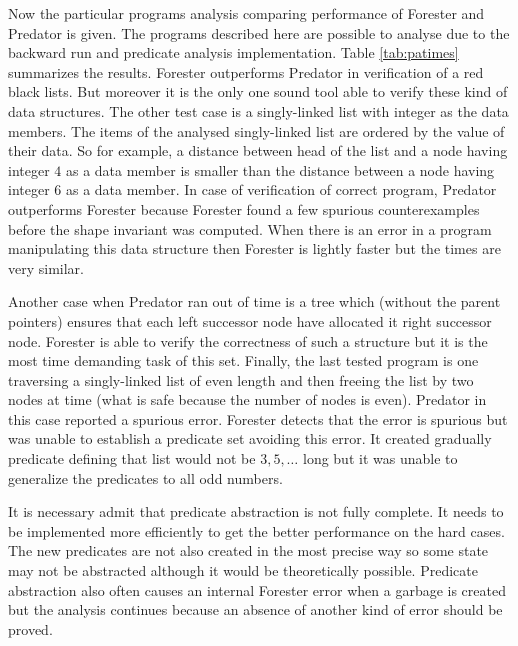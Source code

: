Now the particular programs analysis comparing performance
of Forester and Predator is given.
The programs described here are possible to analyse due to the
backward run and predicate analysis implementation.
Table \ref{tab:patimes} summarizes the results.
Forester outperforms Predator in verification of a red black lists.
But moreover it is the only one sound tool able to verify these
kind of data structures.
The other test case is a singly-linked list with integer
as the data members.
The items of the analysed singly-linked list are ordered
by the value of their data.
So for example, a distance between head of the list and a 
node having integer $4$ as a data member is smaller than
the distance between a node having integer $6$ as a data member.
In case of verification of correct program, Predator outperforms Forester
because Forester found a few spurious counterexamples
before the shape invariant was computed.
When there is an error in a program manipulating this
data structure then Forester is lightly faster
but the times are very similar.

Another case when Predator ran out of time
is a tree which (without the parent pointers) ensures
that each left successor node have allocated it
right successor node.
Forester is able to verify the correctness of such a structure
but it is the most time demanding task of this set.
Finally, the last tested program is one traversing
a singly-linked list of even length and then
freeing the list by two nodes at time (what is safe because
the number of nodes is even).
Predator in this case reported a spurious error.
Forester detects that the error is spurious but was
unable to establish a predicate set avoiding this error.
It created gradually predicate defining that list would not
be $3, 5, \ldots$ long but it was unable to generalize
the predicates to all odd numbers.

It is necessary admit that predicate abstraction
is not fully complete.
It needs to be implemented more efficiently to get the better
performance on the hard cases.
The new predicates are not also created in the most
precise way so some state may not be abstracted
although it would be theoretically possible.
Predicate abstraction also often causes an internal
Forester error when a garbage is created but the
analysis continues because an absence of another
kind of error should be proved.

